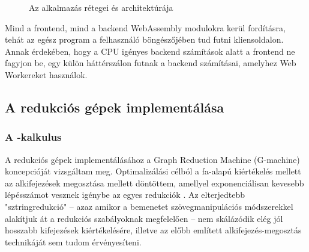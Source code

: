 \documentclass[a4paper,oneside]{article}
\begin{document}
\begin{figure}[htbp]
{
  }
  \captionsetup{justification=centering}
  \caption{Az alkalmazás rétegei és architektúrája}
  \label{fig:tikz-arch}
\end{figure}

Mind a frontend, mind a backend WebAssembly modulokra kerül fordításra, tehát az egész program a felhasználó böngészőjében tud futni kliensoldalon. Annak érdekében, hogy a CPU igényes backend számítások alatt a frontend ne fagyjon be, egy külön háttérszálon futnak a backend számításai, amelyhez Web Workereket használok.

\subsection{A redukciós gépek implementálása}
\label{sec:a-redukcios-gepek-impl}

\subsubsection{A \ski-kalkulus}
\label{sec:a-ski-kalkulus-impl}

A redukciós gépek implementálásához a \foreignlanguage{english}{Graph Reduction Machine} (\foreignlanguage{english}{G-machine}) koncepcióját vizsgáltam meg. Optimalizálási célból a fa-alapú kiértékelés mellett az alkifejezések megosztása mellett döntöttem, amellyel exponenciálisan kevesebb lépésszámot vesznek igénybe az egyes redukciók \cite{LambdaNotFour}. Az elterjedtebb "sztringredukció" -- azaz amikor a bemenetet szövegmanipulációs módszerekkel alakítjuk át a redukciós szabályoknak megfelelően -- nem skálázódik elég jól hosszabb kifejezések kiértékelésére, illetve az előbb említett alkifejezés-megosztás technikáját sem tudom érvényesíteni.
\end{document}
